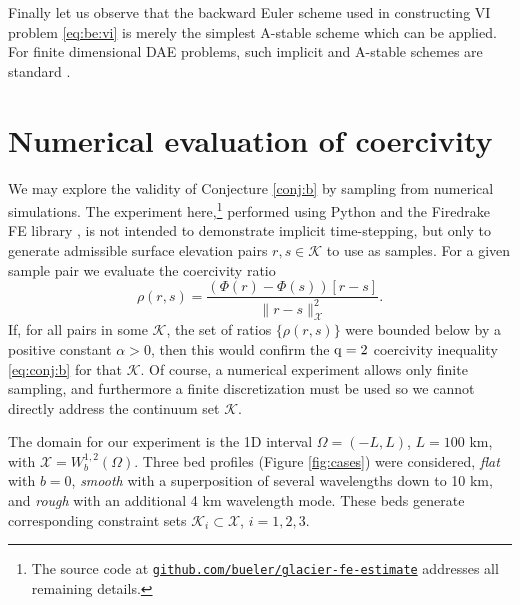 \documentclass[hidelinks,onefignum,onetabnum,final]{siamart220329}  %
\newcommand{\cK}{\mathcal{K}}
\newcommand{\cX}{\mathcal{X}}
\newcommand{\qq}{{\text{\textnormal{q}}}}
\begin{document}
Finally let us observe that the backward Euler scheme used in constructing VI problem \eqref{eq:be:vi} is merely the simplest A-stable \cite{AscherPetzold1998} scheme which can be applied.  For finite dimensional DAE problems, such implicit and A-stable schemes are standard \cite{AscherPetzold1998}.


\section{Numerical evaluation of coercivity} \label{sec:numerical}

We may explore the validity of Conjecture \ref{conj:b} by sampling from numerical simulations.  The experiment here,\footnote{The source code at \href{https://github.com/bueler/glacier-fe-estimate}{\texttt{github.com/bueler/glacier-fe-estimate}} addresses all remaining details.} performed using Python and the Firedrake FE library \cite{Hametal2023}, is not intended to demonstrate implicit time-stepping, but only to generate admissible surface elevation pairs $r,s\in\cK$ to use as samples.  For a given sample pair we evaluate the coercivity ratio
\begin{equation}
\rho(r,s) = \frac{\left(\Phi(r) - \Phi(s)\right)[r-s]}{\|r-s\|_{\cX}^2}. \label{eq:Phiratio}
\end{equation}
If, for all pairs in some $\cK$, the set of ratios $\{\rho(r,s)\}$ were bounded below by a positive constant $\alpha>0$, then this would confirm the $\qq=2$ coercivity inequality \eqref{eq:conj:b} for that $\cK$.  Of course, a numerical experiment allows only finite sampling, and furthermore a finite discretization must be used so we cannot directly address the continuum set $\cK$.

The domain for our experiment is the 1D interval $\Omega=(-L,L)$, $L=100$ km, with $\cX = W_b^{1,2}(\Omega)$.  Three bed profiles  (Figure \ref{fig:cases}) were considered, \emph{flat} with $b=0$, \emph{smooth} with a superposition of several wavelengths down to 10 km, and \emph{rough} with an additional 4 km wavelength mode.  These beds generate corresponding constraint sets $\cK_i \subset \cX$, $i=1,2,3$.
\end{document}
